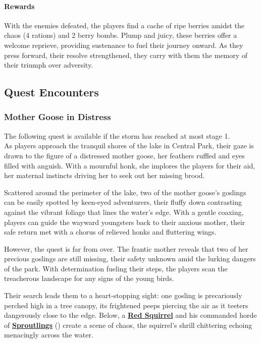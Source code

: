 \paragraph*{Rewards}
With the enemies defeated, the players find a cache of ripe berries amidst the chaos (4 rations) and 2 berry bombs. Plump and juicy, these berries offer a welcome reprieve, providing sustenance to fuel their journey onward. As they press forward, their resolve strengthened, they carry with them the memory of their triumph over adversity.

\subsection*{Quest Encounters}
\subsubsection*{Mother Goose in Distress}
The following quest is available if the storm has reached at most stage 1.\\
As players approach the tranquil shores of the lake in Central Park, their gaze is drawn to the figure of a distressed mother goose, her feathers ruffled and eyes filled with anguish. With a mournful honk, she implores the players for their aid, her maternal instincts driving her to seek out her missing brood.

Scattered around the perimeter of the lake, two of the mother goose's goslings can be easily spotted by keen-eyed adventurers, their fluffy down contrasting against the vibrant foliage that lines the water's edge. With a gentle coaxing, players can guide the wayward youngsters back to their anxious mother, their safe return met with a chorus of relieved honks and fluttering wings.

However, the quest is far from over. The frantic mother reveals that two of her precious goslings are still missing, their safety unknown amid the lurking dangers of the park. With determination fueling their steps, the players scan the treacherous landscape for any signs of the young birds.

Their search leads them to a heart-stopping sight: one gosling is precariously perched high in a tree canopy, its frightened peeps piercing the air as it teeters dangerously close to the edge. Below, a \hyperref[sec:RedSquirrel]{\textbf{Red Squirrel}} and his commanded horde of \hyperref[sec:Sproutling]{\textbf{Sproutlings}} () create a scene of chaos, the squirrel's shrill chittering echoing menacingly across the water.

